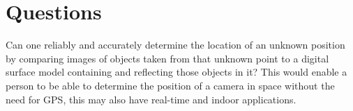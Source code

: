\section{Questions}

Can one reliably and accurately determine the location of an unknown position by comparing images of objects taken from that unknown point to a digital surface model containing and reflecting those objects in it? This would enable a person to be able to determine the position of a camera in space without the need for GPS, this may also have real-time and indoor applications.
